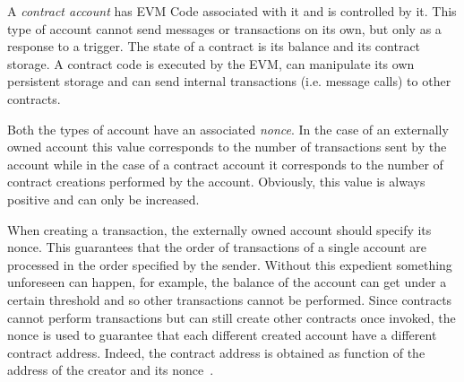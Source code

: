 A \emph{contract account} has EVM Code associated with it and is controlled by
it. This type of account cannot send messages or transactions on its own, but
only as a response to a trigger. The state of a contract is its balance and its
contract storage. A contract code is executed by the EVM, can manipulate its own
persistent storage and can send internal transactions (i.e. message calls) to
other contracts.

Both the types of account have an associated \emph{nonce}. In the case of an
externally owned account this value corresponds to the number of transactions
sent by the account while in the case of a contract account it corresponds to
the number of contract creations performed by the account. Obviously, this value
is always positive and can only be increased.

When creating a transaction, the externally owned account should specify its
nonce. This guarantees that the order of transactions of a single account are
processed in the order specified by the sender. Without this expedient something
unforeseen can happen, for example, the balance of the account can get under a
certain threshold and so other transactions cannot be performed. Since contracts
cannot perform transactions but can still create other contracts once invoked,
the nonce is used to guarantee that each different created account have a
different contract address. Indeed, the contract address is obtained as function
of the address of the creator and its nonce~\cite{wood2018ethereum}.
